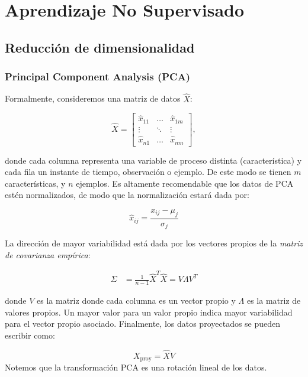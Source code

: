 
\section{Aprendizaje No Supervisado}

\subsection{Reducción de dimensionalidad}
\subsubsection{Principal Component Analysis (PCA)}
Formalmente, consideremos una matriz de datos $\hat{X}$:

$$
\hat{X}=\begin{bmatrix}
        \hat{x}_{11}    & \dots & \hat{x}_{1m}  \\
        \vdots          & \ddots& \vdots        \\
        \hat{x}_{n1}    & \dots & \hat{x}_{nm}
        \end{bmatrix},
$$

\noindent donde cada columna representa una variable de proceso distinta (característica) y cada fila un instante de tiempo, observación o ejemplo. De este modo se tienen $m$ características, y $n$ ejemplos. Es altamente recomendable que los datos de PCA estén normalizados, de modo que la normalización estará dada por:

\begin{equation*}
\hat{x}_{ij} = \frac{x_{ij}-\mu_j}{\sigma_{j}}
\end{equation*}

La dirección de mayor variabilidad está dada por los vectores propios de la \emph{matriz de covarianza empírica}:

\begin{align}
\Sigma & = \frac{1}{n-1}\hat{X}^T\hat{X}= V\Lambda V^T
\end{align}

donde $V$ es la matriz donde cada columna es un vector propio y $\Lambda$ es la matriz de valores propios. Un mayor valor para un valor propio indica mayor variabilidad para el vector propio asociado. Finalmente, los datos proyectados se pueden escribir como:

\begin{equation}
    X_{\text{proy}} = \hat{X}V
\end{equation}
Notemos que la transformación PCA es una rotación lineal de los datos.

